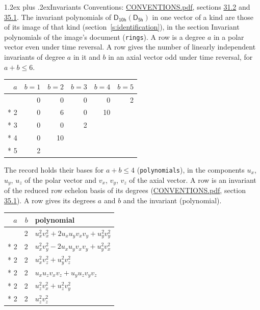 \documentclass[10pt,a4paper]{article}
\makeatletter
\renewcommand\section{\@startsection{section}{1}{\z@}{-3ex plus -1ex minus -.2ex}%
  {1.2ex plus .2ex}{\normalfont\large\sffamily\bfseries\color{parttitle}}}
\numberwithin{equation}{section}
\newcommand{\grp}[1]{\mathsf{#1}}
\makeatother
\begin{document}
\section{Invariants}\label{s:invariants}
Conventions: \href{../../CONVENTIONS.pdf}{CONVENTIONS.pdf}, sections \href{../../CONVENTIONS.pdf\#conv.31.2}{31.2} and \href{../../CONVENTIONS.pdf\#conv.35.1}{35.1}.
The invariant polynomials of $\grp{D_{10h}}(\grp{D_{5h}})$ in one vector of a kind are those of its image of that kind (section~\ref{s:identification}), in the section Invariant polynomials of the image's document (\texttt{rings}).
\leavevmode\label{n:index.degree.polar}\label{n:index.degree.axial}A row is a degree $a$ in a polar vector even under time reversal. A row gives the number of linearly independent invariants of degree $a$ in it and $b$ in an axial vector odd under time reversal, for $a + b \le 6$.
{\small\begin{longtable}{@{}rrrrrr@{}}\toprule
$a$ & $b = 1$ & $b = 2$ & $b = 3$ & $b = 4$ & $b = 5$\\\midrule\endhead
\bottomrule\endfoot\endlastfoot
1 & 0 & 0 & 0 & 0 & 2\\*
2 & 0 & 6 & 0 & 10 & \\*
3 & 0 & 0 & 2 &  & \\*
4 & 0 & 10 &  &  & \\*
5 & 2 &  &  &  & \\
\bottomrule\end{longtable}}
\leavevmode\label{n:local.component.polar}\label{n:local.component.axial}The record holds their bases for $a + b \le 4$ (\texttt{polynomials}), in the components $u_{x}$, $u_{y}$, $u_{z}$ of the polar vector and $v_{x}$, $v_{y}$, $v_{z}$ of the axial vector. \label{n:head.polynomial}A row is an invariant of the reduced row echelon basis of its degrees (\href{../../CONVENTIONS.pdf}{CONVENTIONS.pdf}, section \href{../../CONVENTIONS.pdf\#conv.35.1}{35.1}). A row gives its degrees $a$ and $b$ and the invariant (polynomial).
{\small\renewcommand{\arraystretch}{1.2}\begin{longtable}{@{}rrl@{}}\toprule
$a$ & $b$ & polynomial\\\midrule\endhead
\bottomrule\endfoot\endlastfoot
2 & 2 & $u_{x}^{2}v_{x}^{2} + 2u_{x}u_{y}v_{x}v_{y} + u_{y}^{2}v_{y}^{2}$\\*
2 & 2 & $u_{x}^{2}v_{y}^{2} - 2u_{x}u_{y}v_{x}v_{y} + u_{y}^{2}v_{x}^{2}$\\*
2 & 2 & $u_{x}^{2}v_{z}^{2} + u_{y}^{2}v_{z}^{2}$\\*
2 & 2 & $u_{x}u_{z}v_{x}v_{z} + u_{y}u_{z}v_{y}v_{z}$\\*
2 & 2 & $u_{z}^{2}v_{x}^{2} + u_{z}^{2}v_{y}^{2}$\\*
2 & 2 & $u_{z}^{2}v_{z}^{2}$\\
\bottomrule\end{longtable}}
\end{document}

